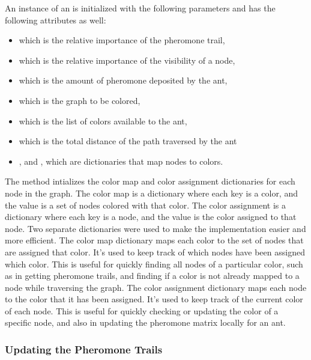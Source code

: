 \documentclass{article}
\theoremstyle{mytheoremstyle}
\theoremstyle{mytheoremstyle}
\theoremstyle{myproblemstyle}
\begin{document}
An instance of an  is initialized with the following parameters and has the following attributes as well:
\begin{itemize}
    \item {} which is the relative importance of the pheromone trail,
    \item {} which is the relative importance of the visibility of a node,
    \item {} which is the amount of pheromone deposited by the ant,
    \item {} which is the graph to be colored,
    \item {} which is the list of colors available to the ant,
    \item {} which is the total distance of the path traversed by the ant
    \item {}, and , which are dictionaries that map nodes to colors.
\end{itemize}

The  method intializes the color map and color assignment dictionaries for each node in the graph. The color map is a dictionary where each key is a color, and the value is a set of nodes colored with that color. The color assignment is a dictionary where each key is a node, and the value is the color assigned to that node. Two separate dictionaries were used to make the implementation easier and more efficient. The color map dictionary maps each color to the set of nodes that are assigned that color. It's used to keep track of which nodes have been assigned which color. This is useful for quickly finding all nodes of a particular color, such as in getting pheromone trails, and finding if a color is not already mapped to a node while traversing the graph. The color assignment dictionary maps each node to the color that it has been assigned. It's used to keep track of the current color of each node. This is useful for quickly checking or updating the color of a specific node, and also in updating the pheromone matrix locally for an ant.

\subsubsection{Updating the Pheromone Trails}
\end{document}
